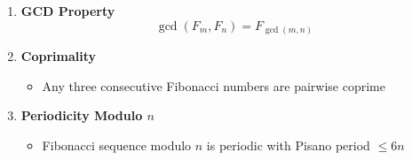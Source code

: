 \begin{enumerate}[leftmargin=*]
    \item \textbf{GCD Property}
        \[\gcd(F_m, F_n) = F_{\gcd(m,n)}\]
    
    \item \textbf{Coprimality}
        \begin{itemize}
            \item Any three consecutive Fibonacci numbers are pairwise coprime
        \end{itemize}
    
    \item \textbf{Periodicity Modulo $n$}
        \begin{itemize}
            \item Fibonacci sequence modulo $n$ is periodic with Pisano period $\leq 6n$
        \end{itemize}
\end{enumerate}